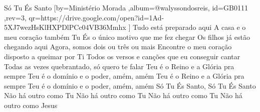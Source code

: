\beginsong
{Só Tu És Santo %
}[by={Ministério Morada %
},album={@walyssondosreis},
id={GB0111 %
},rev={3}, %
qr={https://drive.google.com/open?id=1Ad-5XJ7wezHsKlHXPDlPCc04VB36Mmhx %
}]
\beginverse
Tudo está preparado aqui
A casa e o meu coração também
Tu És o único motivo que me fez chegar
\endverse
\beginverse
Os filhos já estão chegando aqui
Agora, somos dois ou três ou mais
Encontre o meu coração disposto a queimar por Ti
\endverse
\beginverse
Todos os versos e canções que eu conseguir cantar
Todas as vezes quebrantado, só quero te falar
Teu é o Reino e a Glória pra sempre
Teu é o domínio e o poder, amém, amém
Teu é o Reino e a Glória pra sempre
Teu é o domínio e o poder, amém, amém
\endverse
{}
\beginchorus
Só Tu És Santo, Só Tu És Santo
Não há outro como Tu
Não há outro como Tu
Não há outro como Tu
Não há outro como Jesus
\endchorus
{}

